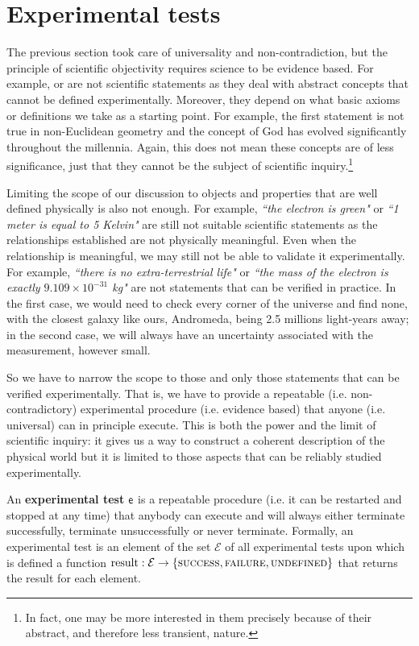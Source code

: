 \documentclass[11pt,letterpaper,fleqn]{memoir} %
\begin{document}
\section{Experimental tests}

The previous section took care of universality and non-contradiction, but the principle of scientific objectivity requires science to be evidence based. For example,  or  are not scientific statements as they deal with abstract concepts that cannot be defined experimentally. Moreover, they depend on what basic axioms or definitions we take as a starting point. For example, the first statement is not true in non-Euclidean geometry and the concept of God has evolved significantly throughout the millennia. Again, this does not mean these concepts are of less significance, just that they cannot be the subject of scientific inquiry.\footnote{In fact, one may be more interested in them precisely because of their abstract, and therefore less transient, nature.}

Limiting the scope of our discussion to objects and properties that are well defined physically is also not enough. For example, \emph{``the electron is green"} or \emph{``1 meter is equal to 5 Kelvin"} are still not suitable scientific statements as the relationships established are not physically meaningful. Even when the relationship is meaningful, we may still not be able to validate it experimentally. For example, \emph{``there is no extra-terrestrial life"} or \emph{``the mass of the electron is exactly $9.109 \times 10^{-31}$ kg"} are not statements that can be verified in practice. In the first case, we would need to check every corner of the universe and find none, with the closest galaxy like ours, Andromeda, being 2.5 millions light-years away; in the second case, we will always have an uncertainty associated with the measurement, however small.

So we have to narrow the scope to those and only those statements that can be verified experimentally. That is, we have to provide a repeatable (i.e. non-contradictory) experimental procedure (i.e. evidence based) that anyone (i.e. universal) can in principle execute. This is both the power and the limit of scientific inquiry: it gives us a way to construct a coherent description of the physical world but it is limited to those aspects that can be reliably studied experimentally.

\begin{mathSection}
\begin{axiom}\label{def_experimental_tests}
	An \textbf{experimental test} $\mathsf{e}$ is a repeatable procedure (i.e. it can be restarted and stopped at any time) that anybody can execute and will always either terminate successfully, terminate unsuccessfully or never terminate. Formally, an experimental test is an element of the set $\mathcal{E}$ of all experimental tests upon which is defined a function $\operatorname{result}: \mathcal{E} \to \{\textsc{success}, \textsc{failure}, \textsc{undefined}\}$ that returns the result for each element.
\end{axiom}
\end{mathSection}
\end{document}
